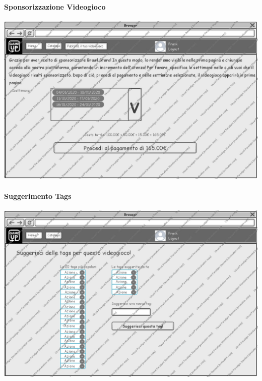 \paragraph{Sponsorizzazione Videogioco}
\begin{center}
\includegraphics[width=\textwidth,height=\textheight,keepaspectratio]{Figure/Mockups/SponsorizzaVideogioco.jpg}
\end{center}

\newpage
\paragraph{Suggerimento Tags}
\begin{center}
\includegraphics[width=\textwidth,height=\textheight,keepaspectratio]{Figure/Mockups/SuggerimentoTags.jpg}
\end{center}

\newpage
